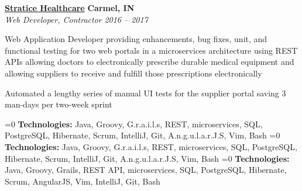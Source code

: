 %
    \headerrow
        {\textbf{\href{https://www.straticehealthcare.com/}{Stratice Healthcare}}}
        {\textbf{Carmel, IN}}
    \\
    \headerrow
        {\emph{Web Developer, Contractor}}
        {\emph{2016 -- 2017}}
    \begin{itemize*}
        \item Web Application Developer providing enhancements, bug fixes, unit, and functional testing for two
            web portals in a microservices architecture using REST APIs allowing doctors to electronically prescribe durable medical equipment and
            allowing suppliers to receive and fulfill those prescriptions electronically
        \item Automated a lengthy series of manual UI tests for the supplier portal saving 3 man-days per two-week sprint
    \end{itemize*}

    \ifnum{}=0
    \hspace{1.0em}
        {\textbf{Technologies:} Java, Groovy, G.r.a.i.l.s, REST, microservices, SQL, PostgreSQL, Hibernate, Scrum, IntelliJ, Git,
        A.n.g.u.l.a.r.J.S, Vim, Bash}
    \fi
    \ifnum{}=0
    \hspace{1.0em}
        {\textbf{Technologies:} Java, Groovy, G.r.a.i.l.s, REST, microservices, SQL, PostgreSQL, Hibernate, Scrum, IntelliJ, Git,
        A.n.g.u.l.a.r.J.S, Vim, Bash}
    \fi
    \ifnum{}=0
    \hspace{1.0em}
        {\textbf{Technologies:} Java, Groovy, Grails, REST API, microservices, SQL, PostgreSQL, Hibernate, Scrum, AngularJS, Vim, IntelliJ, Git, Bash}
    \fi
